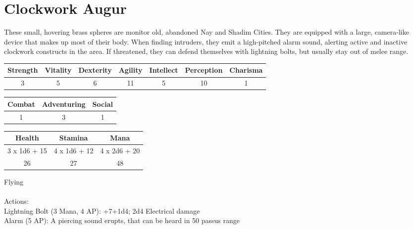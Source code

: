 \pagebreak
\section{Clockwork Augur}

These small, hovering brass spheres are monitor old, abandoned Nay and Shadim Cities. They are equipped with a large, camera-like device that makes up most of their body. When finding intruders, they emit a high-pitched alarm sound, alerting active and inactive clockwork constructs in the area. If threatened, they can defend themselves with lightning bolts, but usually stay out of melee range.\\

\begin{minipage}[H]{1\textwidth}
	\centering
	\begin{tabular}[c]{|c | c | c | c | c | c | c|}
		\hline
		Strength & Vitality & Dexterity & Agility & Intellect & Perception & Charisma\\
		\hline
		3 & 5 & 6 & 11 & 5 & 10 & 1\\
		\hline
	\end{tabular}
\end{minipage}
\bigbreak
\begin{minipage}[H]{1\textwidth}
	\centering
	\begin{tabular}[c]{|c | c | c|}
		\hline
		Combat & Adventuring & Social\\
		\hline
		1 & 3 & 1\\
		\hline
	\end{tabular}
\end{minipage}
\bigbreak
\begin{minipage}[H]{1\textwidth}
	\centering
	\begin{tabular}[c]{|c | c | c|}
		\hline
		Health & Stamina & Mana\\
		\hline
		3 x 1d6 + 15 & 4 x 1d6 + 12 & 4 x 2d6 + 20\\
		26 & 27 & 48\\
		\hline
	\end{tabular}
\end{minipage}
\noindent
Flying\\
\\
Actions:\\
Lightning Bolt (3 Mana, 4 AP): +7+1d4; 2d4 Electrical damage\\
Alarm (5 AP): A piercing sound erupts, that can be heard in 50 passus range\\
